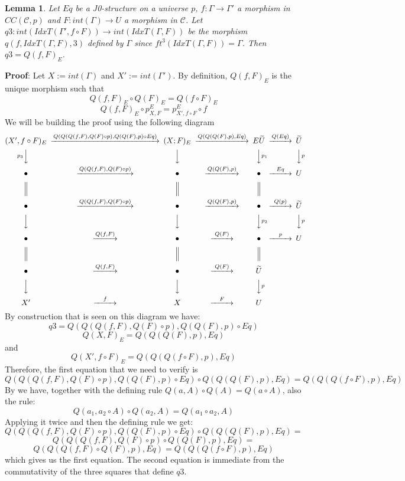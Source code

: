 \documentclass[12pt]{article}
\newenvironment{myproof}{{\bf Proof}:}{\vskip 5mm }
\newtheorem{lemma}[proposition]{Lemma}
\newcommand{\llabel}[1]{\label{#1}}
\newcommand{\sr}{\rightarrow}
\newcommand{\wt}{\widetilde}
\newcommand{\BB}{{\bullet}}
\begin{document}
\begin{lemma}
\llabel{2015.04.04.l4}
Let $Eq$ be a J0-structure on a universe $p$, $f:\Gamma\sr \Gamma'$ a morphism in $CC({\mathcal C},p)$ and $F:int(\Gamma)\sr U$ a morphism in $\mathcal C$.  Let $q3:int(IdxT(\Gamma',f\circ F))\sr int(IdxT(\Gamma,F))$ be the morphism $q(f,IdxT(\Gamma,F),3)$ defined by $\Gamma$ since $ft^3(IdxT(\Gamma,F))=\Gamma$. Then $q3=Q(f,F)_{E}$.
\end{lemma}
%
\begin{myproof}
Let $X:=int(\Gamma)$ and $X':=int(\Gamma')$. By definition, $Q(f,F)_{E}$ is the  unique morphism such that
%
$$Q(f,F)_{E}\circ Q(F)_{E}=Q(f\circ F)_{E}$$
$$Q(f,F)_{E}\circ p^{E}_{X,F}=p^{E}_{X',f\circ F}\circ f$$
%
We will be building the proof using the following diagram
%
$$
\begin{CD}
(X',f\circ F)_{E} @>Q(Q(Q(f,F),Q(F)\circ p),Q(Q(F),p)\circ Eq)>> (X;F)_{E} @>Q(Q(Q(F),p),Eq)>> E\wt{U} @>Q(Eq)>> \wt{U}\\
@Vp_3VV @VVV @VVp_1V @VVp V\\
\BB @>Q(Q(f,F),Q(F)\circ p)>> \BB @>Q(Q(F),p)>> \BB @>Eq>>U\\
@| @| @|\\
\BB @>Q(Q(f,F),Q(F)\circ p)>> \BB @>Q(Q(F),p)>> \BB @>Q(p)>> \wt{U}\\
@VVV @VVV @VVp_2V @VVp V\\
\BB @>Q(f,F)>> \BB @>Q(F)>> \BB @>p>> U\\
@| @| @|\\
\BB @>Q(f,F)>> \BB @>Q(F)>> \wt{U}\\
@VVV @VVV @VVp V\\
X' @>f>> X @>F>> U
\end{CD}
$$
%
By construction that is seen on this diagram we have:
%
$$q3=Q(Q(Q(f,F),Q(F)\circ p),Q(Q(F),p)\circ Eq)$$
$$Q(X,F)_{E}=Q(Q(Q(F),p),Eq)$$
%
and
%
$$Q(X', f\circ F)_{E}=Q(Q(Q(f\circ F),p),Eq)$$
%
Therefore, the first equation that we need to verify is
%
$$Q(Q(Q(f,F),Q(F)\circ p),Q(Q(F),p)\circ Eq)\circ Q(Q(Q(F),p),Eq)=Q(Q(Q(f\circ F),p),Eq)$$
%
By \cite[Lemma 3.2]{fromunivwithPi} we have, together with the defining rule $Q(a,A)\circ Q(A)=Q(a\circ A)$, also the rule:
%
$$Q(a_1,a_2\circ A)\circ Q(a_2,A)=Q(a_1\circ a_2, A)$$
%
Applying it twice and then the defining rule we get:
%
$$Q(Q(Q(f,F),Q(F)\circ p),Q(Q(F),p)\circ Eq)\circ Q(Q(Q(F),p),Eq)=$$
$$Q(Q(Q(f,F),Q(F)\circ p)\circ Q(Q(F),p), Eq)=$$
$$Q(Q(Q(f,F)\circ Q(F),p),Eq)=Q(Q(Q(f\circ F),p),Eq)$$
%
which gives us the first equation. The second equation is immediate from the commutativity of the three squares that define $q3$. 
\end{myproof}
\end{document}
